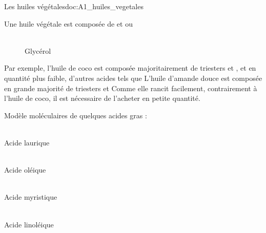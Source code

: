 \begin{doc}{Les huiles végétales}{doc:A1_huiles_vegetales}
  \begin{importants}
    Une huile végétale est composée de  et   ou 
  \end{importants}
  
  \begin{wrapfigure}{r}{0.22\linewidth}
    \centering
     \\[4pt]
    {\small Glycérol}
  \end{wrapfigure}
  
  Par exemple, l'huile de coco est composée majoritairement de triesters  et , et en quantité plus faible, d'autres acides tels que 
  L'huile d'amande douce est composée en grande majorité de triesters  et 
  Comme elle rancit facilement, contrairement à l'huile de coco, il est nécessaire de l'acheter en petite quantité.
  
  \begin{center}
    Modèle moléculaires de quelques acides gras :
  \end{center}
  \vspace*{-24pt}
  \begin{multicols}{2}
    \centering
     \\
    {\small Acide laurique}
    
     \\
    {\small Acide oléique}
    
     \\
    {\small Acide myristique}
    
     \\
    {\small Acide linoléique}
  \end{multicols}
\end{doc}



